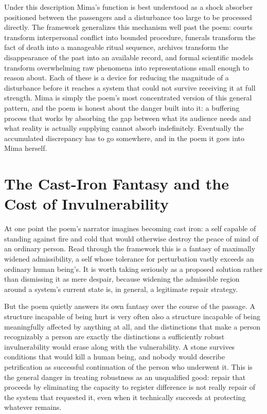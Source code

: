 \documentclass[11pt]{article}
\begin{document}
Under this description Mima's function is best understood as a shock absorber positioned between the passengers and a disturbance too large to be processed directly. The framework generalizes this mechanism well past the poem: courts transform interpersonal conflict into bounded procedure, funerals transform the fact of death into a manageable ritual sequence, archives transform the disappearance of the past into an available record, and formal scientific models transform overwhelming raw phenomena into representations small enough to reason about. Each of these is a device for reducing the magnitude of a disturbance before it reaches a system that could not survive receiving it at full strength. Mima is simply the poem's most concentrated version of this general pattern, and the poem is honest about the danger built into it: a buffering process that works by absorbing the gap between what its audience needs and what reality is actually supplying cannot absorb indefinitely. Eventually the accumulated discrepancy has to go somewhere, and in the poem it goes into Mima herself.

\section{The Cast-Iron Fantasy and the Cost of Invulnerability}

At one point the poem's narrator imagines becoming cast iron: a self capable of standing against fire and cold that would otherwise destroy the peace of mind of an ordinary person. Read through the framework this is a fantasy of maximally widened admissibility, a self whose tolerance for perturbation vastly exceeds an ordinary human being's. It is worth taking seriously as a proposed solution rather than dismissing it as mere despair, because widening the admissible region around a system's current state is, in general, a legitimate repair strategy.

But the poem quietly answers its own fantasy over the course of the passage. A structure incapable of being hurt is very often also a structure incapable of being meaningfully affected by anything at all, and the distinctions that make a person recognizably a person are exactly the distinctions a sufficiently robust invulnerability would erase along with the vulnerability. A stone survives conditions that would kill a human being, and nobody would describe petrification as successful continuation of the person who underwent it. This is the general danger in treating robustness as an unqualified good: repair that proceeds by eliminating the capacity to register difference is not really repair of the system that requested it, even when it technically succeeds at protecting whatever remains.
\end{document}
